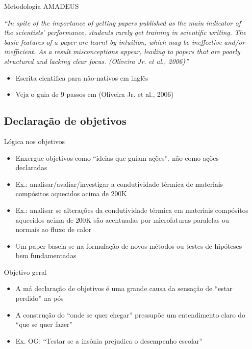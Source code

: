 \begin{frame}{Metodologia AMADEUS} 
\begin{block}
\small{\emph{``In spite of the importance of getting papers published as the main indicator of the scientists' performance, students rarely get training in scientific writing. The basic features of a paper are learnt by intuition, which may be ineffective and/or inefficient. As a result misconceptions appear, leading to papers that are poorly structured and lacking clear focus. (Oliveira Jr. et al., 2006)''}}
\end{block}
\begin{itemize}
\item Escrita científica para não-nativos em inglês 
\item Veja o guia de 9 passos em (Oliveira Jr. et al., 2006)
\end{itemize}
\end{frame}

\subsection{Declaração de objetivos}

\begin{frame}{Lógica nos objetivos}
\begin{itemize}
\item Enxergue objetivos como ``ideias que guiam ações'', não como ações declaradas 
\item Ex.: analisar/avaliar/investigar a condutividade térmica de materiais compósitos aquecidos acima de 200K 
\item Ex.: analisar se alterações da condutividade térmica em materiais compósitos aquecidos acima de 200K são  acentuadas por microfaturas paralelas ou normais ao fluxo de calor
\item Um paper baseia-se na formulação de novos métodos ou testes de hipóteses bem fundamentadas
\end{itemize}
\end{frame}

\begin{frame}{Objetivo geral}
\begin{itemize}
\item A má declaração de objetivos é uma grande causa da sensação de ``estar perdido'' na pós 
\item A construção do ``onde se quer chegar'' pressupõe um entendimento claro do ``que se quer fazer''
\item Ex. OG: ``Testar se a insônia prejudica o desempenho escolar''
\end{itemize}
\end{frame}

